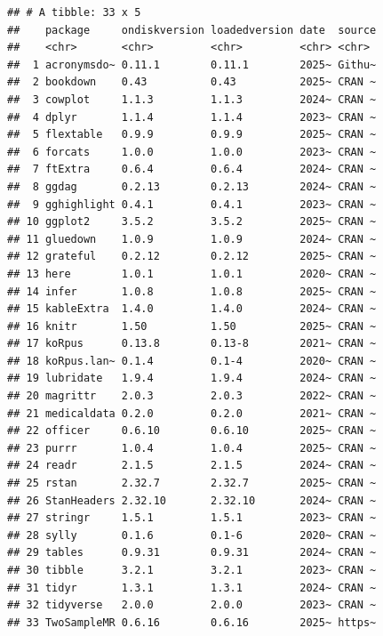 \documentclass[
]{article}
\begin{document}
\begin{verbatim}
## # A tibble: 33 x 5
##    package     ondiskversion loadedversion date  source
##    <chr>       <chr>         <chr>         <chr> <chr> 
##  1 acronymsdo~ 0.11.1        0.11.1        2025~ Githu~
##  2 bookdown    0.43          0.43          2025~ CRAN ~
##  3 cowplot     1.1.3         1.1.3         2024~ CRAN ~
##  4 dplyr       1.1.4         1.1.4         2023~ CRAN ~
##  5 flextable   0.9.9         0.9.9         2025~ CRAN ~
##  6 forcats     1.0.0         1.0.0         2023~ CRAN ~
##  7 ftExtra     0.6.4         0.6.4         2024~ CRAN ~
##  8 ggdag       0.2.13        0.2.13        2024~ CRAN ~
##  9 gghighlight 0.4.1         0.4.1         2023~ CRAN ~
## 10 ggplot2     3.5.2         3.5.2         2025~ CRAN ~
## 11 gluedown    1.0.9         1.0.9         2024~ CRAN ~
## 12 grateful    0.2.12        0.2.12        2025~ CRAN ~
## 13 here        1.0.1         1.0.1         2020~ CRAN ~
## 14 infer       1.0.8         1.0.8         2025~ CRAN ~
## 15 kableExtra  1.4.0         1.4.0         2024~ CRAN ~
## 16 knitr       1.50          1.50          2025~ CRAN ~
## 17 koRpus      0.13.8        0.13-8        2021~ CRAN ~
## 18 koRpus.lan~ 0.1.4         0.1-4         2020~ CRAN ~
## 19 lubridate   1.9.4         1.9.4         2024~ CRAN ~
## 20 magrittr    2.0.3         2.0.3         2022~ CRAN ~
## 21 medicaldata 0.2.0         0.2.0         2021~ CRAN ~
## 22 officer     0.6.10        0.6.10        2025~ CRAN ~
## 23 purrr       1.0.4         1.0.4         2025~ CRAN ~
## 24 readr       2.1.5         2.1.5         2024~ CRAN ~
## 25 rstan       2.32.7        2.32.7        2025~ CRAN ~
## 26 StanHeaders 2.32.10       2.32.10       2024~ CRAN ~
## 27 stringr     1.5.1         1.5.1         2023~ CRAN ~
## 28 sylly       0.1.6         0.1-6         2020~ CRAN ~
## 29 tables      0.9.31        0.9.31        2024~ CRAN ~
## 30 tibble      3.2.1         3.2.1         2023~ CRAN ~
## 31 tidyr       1.3.1         1.3.1         2024~ CRAN ~
## 32 tidyverse   2.0.0         2.0.0         2023~ CRAN ~
## 33 TwoSampleMR 0.6.16        0.6.16        2025~ https~
\end{verbatim}

\newpage
\end{document}
